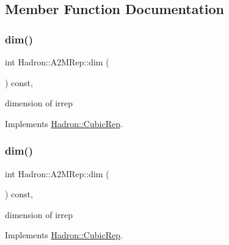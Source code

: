 \subsection{Member Function Documentation}
\mbox{\label{structHadron_1_1A2MRep_a4beb5fe1320c7139fecc080ff29d8f0d}} 
\subsubsection{\texorpdfstring{dim()}{dim()}\hspace{0.1cm}{\footnotesize\ttfamily [1/3]}}
{\footnotesize\ttfamily int Hadron\+::\+A2\+M\+Rep\+::dim (\begin{DoxyParamCaption}{ }\end{DoxyParamCaption}) const\hspace{0.3cm}{\ttfamily [inline]}, {\ttfamily [virtual]}}

dimension of irrep 

Implements \mbox{\hyperlink{structHadron_1_1CubicRep_ac178d14064f037a66af4b9fb4b312d51}{Hadron\+::\+Cubic\+Rep}}.

\mbox{\label{structHadron_1_1A2MRep_a4beb5fe1320c7139fecc080ff29d8f0d}} 
\subsubsection{\texorpdfstring{dim()}{dim()}\hspace{0.1cm}{\footnotesize\ttfamily [2/3]}}
{\footnotesize\ttfamily int Hadron\+::\+A2\+M\+Rep\+::dim (\begin{DoxyParamCaption}{ }\end{DoxyParamCaption}) const\hspace{0.3cm}{\ttfamily [inline]}, {\ttfamily [virtual]}}

dimension of irrep 

Implements \mbox{\hyperlink{structHadron_1_1CubicRep_ac178d14064f037a66af4b9fb4b312d51}{Hadron\+::\+Cubic\+Rep}}.

\mbox{\label{structHadron_1_1A2MRep_a4beb5fe1320c7139fecc080ff29d8f0d}} 
